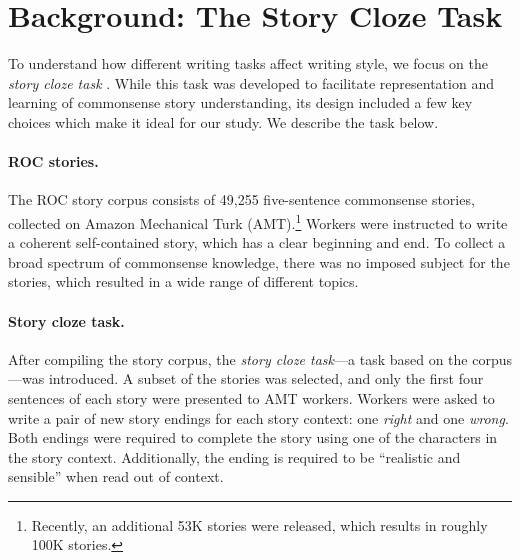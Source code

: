 \documentclass[11pt,a4paper]{article}
\newcommand{\secref}[1]{Section~\ref{ssec:#1}}
\newcommand{\isection}[2]{\section{#1}\label{ssec:#2}}
\newcommand{\com}[1]{}
\newcommand{\clinic}[1]{{\color{magenta}\textsc{[#1 --CLINIC]}}}
\begin{document}
\com{
The remainder of this paper is organized as follows. In \secref{ROC_Story} we describe the story cloze task.
We then present our model, experiments and results in Sections \ref{ssec:Model}, \ref{ssec:Experiments} and \ref{ssec:Results} respectively.
Sections \ref{ssec:Ablation} and \ref{ssec:Discussion} present a further analysis of our results  and a discussion, followed by related work and conclusions.\clinic{Omit this paragraph?}}

\isection{Background: The Story Cloze Task}{ROC_Story}
To understand how different writing tasks affect writing style, 
we focus on the \textit{story cloze task} \cite{Mostafazadeh:2016}. 
While this task was developed to facilitate representation and learning of commonsense story understanding,
its design included a few key choices which  make it ideal for our study. 
We describe the task below.




\paragraph{ROC stories.}

The ROC story corpus consists of 49,255 five-sentence commonsense
stories, collected on Amazon Mechanical Turk (AMT).\footnote{Recently,
  an additional 53K stories were released, which results in roughly
  100K stories.}
Workers were instructed to write a coherent self-contained story, which has a clear beginning and end. 
To collect a broad spectrum of commonsense knowledge, there was no imposed subject for the stories,
which resulted in a wide range of different topics.

\paragraph{Story cloze task.}
After compiling the story corpus, the {\it story cloze task}---a task based on the corpus---was introduced.
A subset of the stories was selected, and only the first four sentences of each story were presented to AMT workers.
Workers were asked to write a pair of new story endings for each story context: one {\it right} and one {\it wrong}.
Both endings were required to complete the story using one of the characters in the story context. 
Additionally,  the ending is required to be ``realistic and sensible'' \cite{Mostafazadeh:2016} when read out of context.
\end{document}
